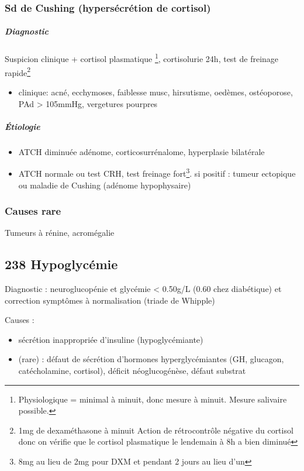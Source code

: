\documentclass[11pt]{article}
\begin{document}
\subsubsection{Sd de Cushing (hypersécrétion de cortisol)}
\label{sec:orgcd71543}

\subparagraph{Diagnostic}
\label{sec:org7511450}
Suspicion clinique + cortisol plasmatique \footnote{Physiologique = minimal à minuit, donc mesure à minuit. Mesure salivaire possible.}, cortisolurie 24h, test de freinage rapide\footnote{1mg de dexaméthasone à minuit Action de rétrocontrôle négative du
cortisol donc on vérifie que le cortisol plasmatique le lendemain à 8h a bien diminué}
\begin{itemize}
\item clinique: acné, ecchymoses, faiblesse musc, hirsutisme, oedèmes, ostéoporose, PAd
> 105mmHg, vergetures pourpres
\end{itemize}

\subparagraph{Étiologie}
\label{sec:orgeac6acf}
\begin{itemize}
\item ATCH diminuée \thus adénome, corticosurrénalome, hyperplasie bilatérale
\item ATCH normale ou \inc \thus test CRH, test freinage fort\footnote{8mg au lieu de 2mg pour DXM et pendant 2 jours au lieu d'un}. si positif : tumeur ectopique ou
maladie de Cushing  (adénome hypophysaire)
\end{itemize}

\subsubsection{Causes rare}
\label{sec:org3e2cd85}
Tumeurs à rénine, acromégalie
\subsection{238 \textdagger{} Hypoglycémie}
\label{sec:org3f0b84d}
Diagnostic : neuroglucopénie et glycémie < 0.50g/L (0.60 chez diabétique) et correction symptômes
à normalisation (triade de Whipple)

Causes :
\begin{itemize}
\item sécrétion inappropriée d'insuline (hypoglycémiante)
\item (rare) : défaut de sécrétion d'hormones hyperglycémiantes (GH, glucagon,
catécholamine, cortisol), déficit néoglucogénèse, défaut substrat
\end{itemize}
\end{document}
